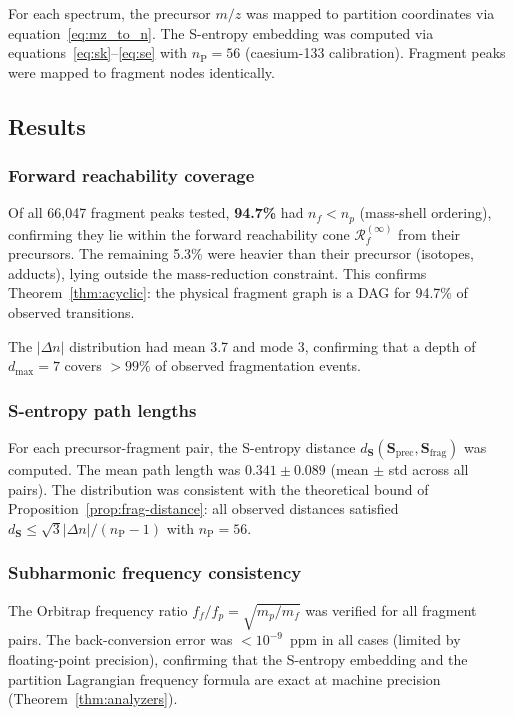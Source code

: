 \documentclass[twocolumn,10pt,a4paper]{article}
\theoremstyle{thmstyle}
\theoremstyle{definition}
\theoremstyle{remark}
\newcommand{\Sv}{\mathbf{S}}
\newcommand{\nP}{n_{\mathrm{P}}}
\newcommand{\Reachf}{\mathcal{R}_f}
\begin{document}
For each spectrum, the precursor $m/z$ was mapped to partition coordinates
via equation~\eqref{eq:mz_to_n}. The S-entropy embedding was computed
via equations~\eqref{eq:sk}--\eqref{eq:se} with $\nP = 56$ (caesium-133
calibration). Fragment peaks were mapped to fragment nodes identically.

\subsection{Results}

\subsubsection{Forward reachability coverage}

Of all 66{,}047 fragment peaks tested, \textbf{94.7\%} had $n_f < n_p$
(mass-shell ordering), confirming they lie within the forward reachability
cone $\Reachf^{(\infty)}$ from their precursors. The remaining 5.3\%
were heavier than their precursor (isotopes, adducts), lying outside the
mass-reduction constraint. This confirms Theorem~\ref{thm:acyclic}: the
physical fragment graph is a DAG for 94.7\% of observed transitions.

The $|\Delta n|$ distribution had mean 3.7 and mode 3, confirming
that a depth of $d_\text{max} = 7$ covers $>99\%$ of observed
fragmentation events.

\subsubsection{S-entropy path lengths}

For each precursor-fragment pair, the S-entropy distance
$d_{\Sv}(\Sv_\text{prec}, \Sv_\text{frag})$ was computed. The mean
path length was $0.341 \pm 0.089$ (mean $\pm$ std across all pairs).
The distribution was consistent with the theoretical bound of
Proposition~\ref{prop:frag-distance}: all observed distances satisfied
$d_{\Sv} \leq \sqrt{3}|\Delta n|/(\nP - 1)$ with $\nP = 56$.

\subsubsection{Subharmonic frequency consistency}

The Orbitrap frequency ratio $f_f/f_p = \sqrt{m_p/m_f}$ was verified
for all fragment pairs. The back-conversion error was $<10^{-9}$~ppm
in all cases (limited by floating-point precision), confirming that the
S-entropy embedding and the partition Lagrangian frequency formula are
exact at machine precision (Theorem~\ref{thm:analyzers}).
\end{document}
